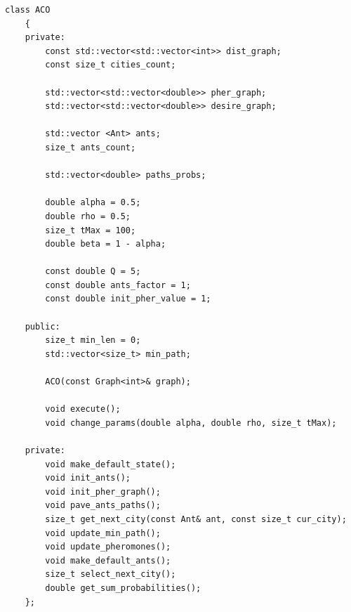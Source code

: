 \documentclass[12pt, a4paper]{report}
\begin{document}
    \begin{lstlisting}[label=code:aco_class,caption=Класс алгоритма ACO]
    class ACO
    {
    private:
	    const std::vector<std::vector<int>> dist_graph;
	    const size_t cities_count;
	    
	    std::vector<std::vector<double>> pher_graph;
	    std::vector<std::vector<double>> desire_graph;
	    
	    std::vector <Ant> ants;
	    size_t ants_count;
	    
	    std::vector<double> paths_probs;
	    
	    double alpha = 0.5;
	    double rho = 0.5;
	    size_t tMax = 100;
	    double beta = 1 - alpha;
	    
	    const double Q = 5;
	    const double ants_factor = 1;
	    const double init_pher_value = 1;
    
    public:
    	size_t min_len = 0;
    	std::vector<size_t> min_path;
    
    	ACO(const Graph<int>& graph);
    
    	void execute();
    	void change_params(double alpha, double rho, size_t tMax);
    
    private:
	    void make_default_state();
	    void init_ants();
	    void init_pher_graph();
	    void pave_ants_paths();
	    size_t get_next_city(const Ant& ant, const size_t cur_city);
	    void update_min_path();
	    void update_pheromones();
	    void make_default_ants();
	    size_t select_next_city();
	    double get_sum_probabilities();
    };
    \end{lstlisting}
    
\end{document}

